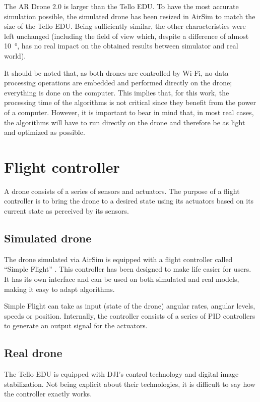 The AR Drone 2.0 is larger than the Tello EDU. To have the most accurate simulation possible, the simulated drone has been resized in AirSim to match the size of the Tello EDU. Being sufficiently similar, the other characteristics were left unchanged (including the field of view which, despite a difference of almost \SI{10}{\degree}, has no real impact on the obtained results between simulator and real world).

It should be noted that, as both drones are controlled by Wi-Fi, no data processing operations are embedded and performed directly on the drone; everything is done on the computer. This implies that, for this work, the processing time of the algorithms is not critical since they benefit from the power of a computer. However, it is important to bear in mind that, in most real cases, the algorithms will have to run directly on the drone and therefore be as light and optimized as possible.

\section{Flight controller}

A drone consists of a series of sensors and actuators. The purpose of a flight controller is to bring the drone to a desired state using its actuators based on its current state as perceived by its sensors.

\subsection{Simulated drone}

The drone simulated via AirSim is equipped with a flight controller called \enquote{Simple Flight} \cite{airsim2021simpleflight}. This controller has been designed to make life easier for users. It has its own interface and can be used on both simulated and real models, making it easy to adapt algorithms.

Simple Flight can take as input (state of the drone) angular rates, angular levels, speeds or position. Internally, the controller consists of a series of PID controllers to generate an output signal for the actuators.

\subsection{Real drone}

The Tello EDU is equipped with DJI's control technology and digital image stabilization. Not being explicit about their technologies, it is difficult to say how the controller exactly works.

